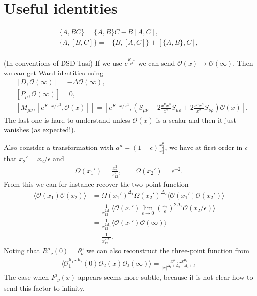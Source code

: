 \documentclass[letterpaper]{article}
\let\Oldsection\section
\renewcommand{\section}{\FloatBarrier\Oldsection}
\def\Om{{\mathcal{O}}}
\def\ph{\phantom}
\def \ph{\phantom}
\begin{document}
\appendix



\section{Useful identities}

\begin{align}
 \{ A, B C \} = \{ A, B \} C - B [A, C], \\
 \{ A, [B, C] \} = - \{ B, [A, C] \}  + [ \{A, B \}, C], \\
\end{align}

(In conventions of DSD Tasi) If we use $e^{\frac{K \cdot x}{x^2}}$ we can send $\Om(x) \to \Om(\infty)$. Then we can get Ward identities using
\begin{align}
 & [D, \Om(\infty)] = -\Delta \Om(\infty), \\
 & [P_\mu, \Om(\infty)] = 0, \\
 & [M_{\mu\nu}, [e^{K\cdot x/x^2}, \Om(x)]] 
 = \left[ e^{K\cdot x/x^2}, \left(
    S_{\mu\nu} 
    - 2 \frac{x^\nu x^\rho}{x^2} S_{\mu\rho}
    + 2 \frac{x^\mu x^\rho}{x^2} S_{\nu\rho}
 \right) \Om(x) \right].
\end{align}
The last one is hard to understand unless $\Om(x)$ is a scalar and then it just vanishes (as expected!).

Also consider a transformation with $a^\mu = (1-\epsilon) \frac{x_2^\mu}{x_2^2}$, we have at first order in $\epsilon$ that $x_2' = x_2 / \epsilon$ and
\begin{align}
 \Omega(x_1') = \frac{x_2^2}{x_{12}^2}, \qquad
 \Omega(x_2') = \epsilon^{-2}.
\end{align}
From this we can for instance recover the two point function
\begin{align}
 \langle \Om(x_1) \Om(x_2) \rangle
 & = \Omega(x_1')^{\Delta_1} \Omega(x_2')^{\Delta_2} \langle \Om(x_1') \Om(x_2') \rangle \\
 & = \frac{1}{x_{12}^{2\Delta_1}} \langle \Om(x_1') 
     \lim_{\epsilon\to0} \left( \frac{x_2}{\epsilon}\right)^{2\Delta_2} \Om(x_2/\epsilon) 
     \rangle \\
 & = \frac{1}{x_{12}^{2\Delta_1}} \langle \Om(x_1') \Om(\infty) \rangle \\
 & = \frac{1}{x_{12}^{2\Delta_1}}.
\end{align}
Noting that $R^\mu_{\ph \mu\nu}(0) = \delta^\mu_\nu$ we can also reconstruct the three-point function from
\begin{align}
 \langle \Om_1^{\mu_1 \ldots \mu_\ell}(0) \Om_2(x) \Om_3(\infty) \rangle
 = \frac{x^{\mu_1} \ldots x^{\mu_\ell} }{|x|^{\Delta_1 + \Delta_2 - \Delta_3 + \ell}}
\end{align}
The case when $I^\mu_{\ph \mu\nu}(x)$ appears seems more subtle, because it is not clear how to send this factor to infinity.
\end{document}
